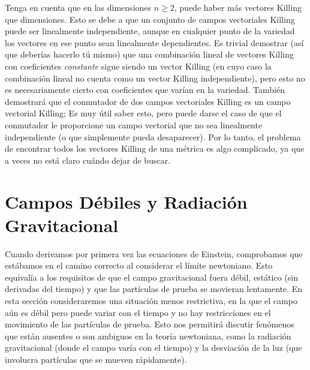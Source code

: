 \documentclass[11pt,b5paper,openany,twoside]{book}
\begin{document}
Tenga en cuenta que en las dimensiones $n\geq 2$, puede haber más vectores Killing que dimensiones.
Esto se debe a que un conjunto de campos vectoriales Killing puede ser linealmente independiente, aunque en cualquier punto de la variedad los vectores en ese punto sean linealmente dependientes.
Es trivial demostrar (así que deberías hacerlo tú mismo) que una combinación lineal de vectores Killing con coeficientes {\it constante} sigue siendo un vector Killing (en cuyo caso la combinación lineal no cuenta como un vector Killing independiente), pero esto no es necesariamente cierto con coeficientes que varían en la variedad.
También demostrará que el conmutador de dos campos vectoriales Killing es un campo vectorial Killing; Es muy útil saber esto, pero puede darse el caso de que el conmutador le proporcione un campo vectorial que no sea linealmente independiente (o que simplemente pueda desaparecer).
Por lo tanto, el problema de encontrar todos los vectores Killing de una métrica es algo complicado, ya que a veces no está claro cuándo dejar de buscar.





\chapter{Campos Débiles y Radiación Gravitacional}



Cuando derivamos por primera vez las ecuaciones de Einstein, comprobamos que estábamos en el camino correcto al considerar el límite newtoniano.
Esto equivalía a los requisitos de que el campo gravitacional fuera débil, estático (sin derivadas del tiempo) y que las partículas de prueba se movieran lentamente.
En esta sección consideraremos una situación menos restrictiva, en la que el campo aún es débil pero puede variar con el tiempo y no hay restricciones en el movimiento de las partículas de prueba.
Esto nos permitirá discutir fenómenos que están ausentes o son ambiguos en la teoría newtoniana, como la radiación gravitacional (donde el campo varía con el tiempo) y la desviación de la luz (que involucra partículas que se mueven rápidamente).
\end{document}
